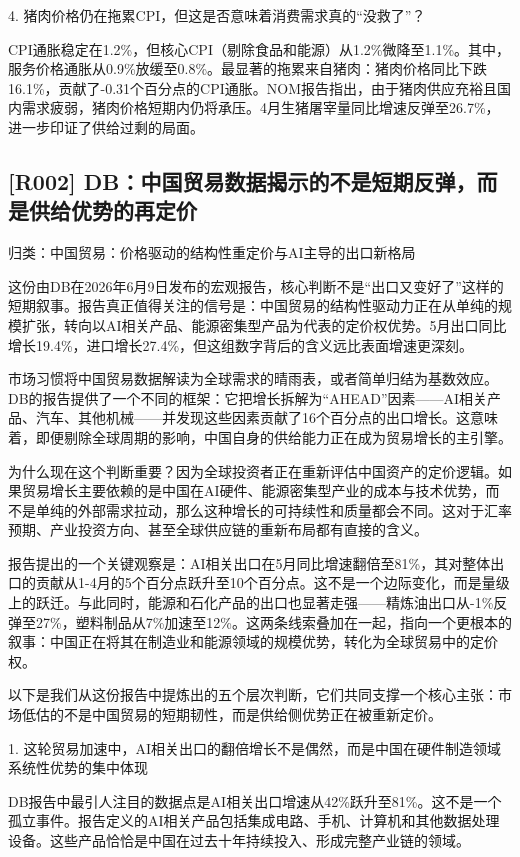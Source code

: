 \documentclass[11pt]{ctexart}
\begin{document}
4. 猪肉价格仍在拖累CPI，但这是否意味着消费需求真的“没救了”？

CPI通胀稳定在1.2\%，但核心CPI（剔除食品和能源）从1.2\%微降至1.1\%。其中，服务价格通胀从0.9\%放缓至0.8\%。最显著的拖累来自猪肉：猪肉价格同比下跌16.1\%，贡献了-0.31个百分点的CPI通胀。NOM报告指出，由于猪肉供应充裕且国内需求疲弱，猪肉价格短期内仍将承压。4月生猪屠宰量同比增速反弹至26.7\%，进一步印证了供给过剩的局面。

\subsection{[R002] DB：中国贸易数据揭示的不是短期反弹，而是供给优势的再定价}
{\small\color{refgray}归类：中国贸易：价格驱动的结构性重定价与AI主导的出口新格局}

这份由DB在2026年6月9日发布的宏观报告，核心判断不是“出口又变好了”这样的短期叙事。报告真正值得关注的信号是：中国贸易的结构性驱动力正在从单纯的规模扩张，转向以AI相关产品、能源密集型产品为代表的定价权优势。5月出口同比增长19.4\%，进口增长27.4\%，但这组数字背后的含义远比表面增速更深刻。

市场习惯将中国贸易数据解读为全球需求的晴雨表，或者简单归结为基数效应。DB的报告提供了一个不同的框架：它把增长拆解为“AHEAD”因素——AI相关产品、汽车、其他机械——并发现这些因素贡献了16个百分点的出口增长。这意味着，即便剔除全球周期的影响，中国自身的供给能力正在成为贸易增长的主引擎。

为什么现在这个判断重要？因为全球投资者正在重新评估中国资产的定价逻辑。如果贸易增长主要依赖的是中国在AI硬件、能源密集型产业的成本与技术优势，而不是单纯的外部需求拉动，那么这种增长的可持续性和质量都会不同。这对于汇率预期、产业投资方向、甚至全球供应链的重新布局都有直接的含义。

报告提出的一个关键观察是：AI相关出口在5月同比增速翻倍至81\%，其对整体出口的贡献从1-4月的5个百分点跃升至10个百分点。这不是一个边际变化，而是量级上的跃迁。与此同时，能源和石化产品的出口也显著走强——精炼油出口从-1\%反弹至27\%，塑料制品从7\%加速至12\%。这两条线索叠加在一起，指向一个更根本的叙事：中国正在将其在制造业和能源领域的规模优势，转化为全球贸易中的定价权。

以下是我们从这份报告中提炼出的五个层次判断，它们共同支撑一个核心主张：市场低估的不是中国贸易的短期韧性，而是供给侧优势正在被重新定价。

1. 这轮贸易加速中，AI相关出口的翻倍增长不是偶然，而是中国在硬件制造领域系统性优势的集中体现

DB报告中最引人注目的数据点是AI相关出口增速从42\%跃升至81\%。这不是一个孤立事件。报告定义的AI相关产品包括集成电路、手机、计算机和其他数据处理设备。这些产品恰恰是中国在过去十年持续投入、形成完整产业链的领域。
\end{document}
